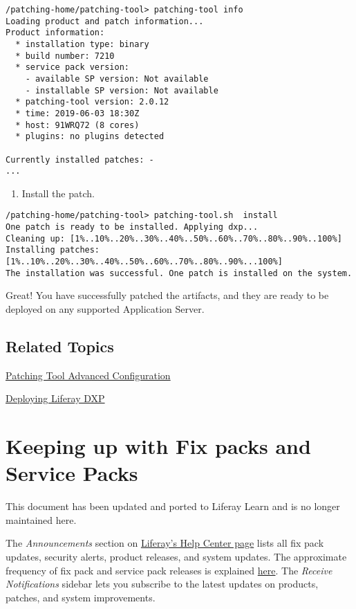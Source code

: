\begin{verbatim}
/patching-home/patching-tool> patching-tool info
Loading product and patch information...
Product information:
  * installation type: binary
  * build number: 7210
  * service pack version:
    - available SP version: Not available
    - installable SP version: Not available
  * patching-tool version: 2.0.12
  * time: 2019-06-03 18:30Z
  * host: 91WRQ72 (8 cores)
  * plugins: no plugins detected

Currently installed patches: -
...
\end{verbatim}

\begin{enumerate}
\def\labelenumi{\arabic{enumi}.}
\setcounter{enumi}{4}
\tightlist
\item
  Install the patch.
\end{enumerate}

\begin{verbatim}
/patching-home/patching-tool> patching-tool.sh  install
One patch is ready to be installed. Applying dxp...
Cleaning up: [1%..10%..20%..30%..40%..50%..60%..70%..80%..90%..100%]
Installing patches: [1%..10%..20%..30%..40%..50%..60%..70%..80%..90%...100%]
The installation was successful. One patch is installed on the system.
\end{verbatim}

Great! You have successfully patched the artifacts, and they are ready
to be deployed on any supported Application Server.

\section{Related Topics}\label{related-topics-3}

\href{/docs/7-2/deploy/-/knowledge_base/d/patching-tool-advanced-configuration}{Patching
Tool Advanced Configuration}

\href{/docs/7-2/deploy/-/knowledge_base/d/deploying-product}{Deploying
Liferay DXP}

\chapter{Keeping up with Fix packs and Service
Packs}\label{keeping-up-with-fix-packs-and-service-packs}

{This document has been updated and ported to Liferay Learn and is no
longer maintained here.}

The \emph{Announcements} section on
\href{https://help.liferay.com/hc}{Liferay's Help Center page} lists all
fix pack updates, security alerts, product releases, and system updates.
The approximate frequency of fix pack and service pack releases is
explained
\href{/docs/7-2/deploy/-/knowledge_base/d/patching-basics}{here}. The
\emph{Receive Notifications} sidebar lets you subscribe to the latest
updates on products, patches, and system improvements.

